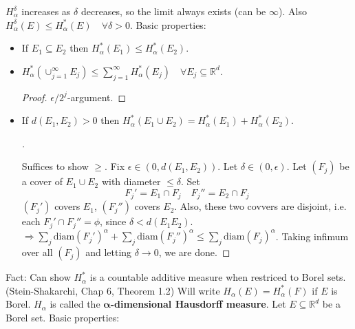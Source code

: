 \documentclass{article}
\theoremstyle{definition}
\newenvironment{proofs}[1][\proofname]{%
  \begin{proof}[#1]$ $\par\nobreak\ignorespaces
}{%
  \end{proof}
}
\newcommand{\RR}{\mathbb R}
\newcommand{\Ra}{\Rightarrow}
\begin{document}
$H_\alpha^\delta$ increases as $\delta$ decreases, so the limit always exists (can be $\infty$).
Also $H_\alpha^\delta(E) \leq H_\alpha^*(E) \quad \forall \delta > 0$. 
Basic properties:

\begin{itemize}
	\item If $E_1 \subseteq E_2$ then $H_\alpha^*(E_1) \leq H_\alpha^*(E_2)$.

	\item $H_\alpha^*(\cup_{j = 1}^\infty E_j) \leq \sum_{j = 1}^\infty H_\alpha^*(E_j) \quad \forall E_j \subseteq \RR^d$.

		\begin{proof}
			$\epsilon/2^j$-argument.
		\end{proof}

	\item If $d(E_1, E_2) > 0$ then $H_\alpha^*(E_1 \cup E_2) = H_\alpha^*(E_1) + H_\alpha^*(E_2)$.

		\begin{proofs}
			Suffices to show $\geq$.
			Fix $\epsilon \in (0, d(E_1, E_2))$.
			Let $\delta \in (0, \epsilon)$.
			Let $(F_j)$ be a cover of $E_1 \cup E_2$ with diameter $\leq \delta$.
			Set 
			\[
				F_j' = E_1 \cap F_j \quad F_j'' = E_2 \cap F_j
			\]
			$(F_j')$ covers $E_1$, $(F_j'')$ covers $E_2$.
			Also, these two covvers are disjoint, i.e. each $F_j' \cap F_j'' = \phi$, since $\delta < d(E_1 E_2)$.
			$\Ra \sum_j \text{diam}(F_j')^\alpha + \sum_j \text{diam}(F_j'')^\alpha \leq \sum_j \text{diam}(F_j)^\alpha$.
			Taking infimum over all $(F_j)$ and letting $\delta \to 0$, we are done.
		\end{proofs}
\end{itemize}

Fact: Can show $H_\alpha^*$ is a countable additive measure when restriced to Borel sets. 
(Stein-Shakarchi, Chap 6, Theorem 1.2)
Will write $H_\alpha(E) = H_\alpha^*(F)$ if $E$ is Borel.
$H_\alpha$ is called the \textbf{$\bm{\alpha}$-dimensional Hausdorff measure}.
Let $E \subseteq \RR^d$ be a Borel set.
Basic properties:
\end{document}
